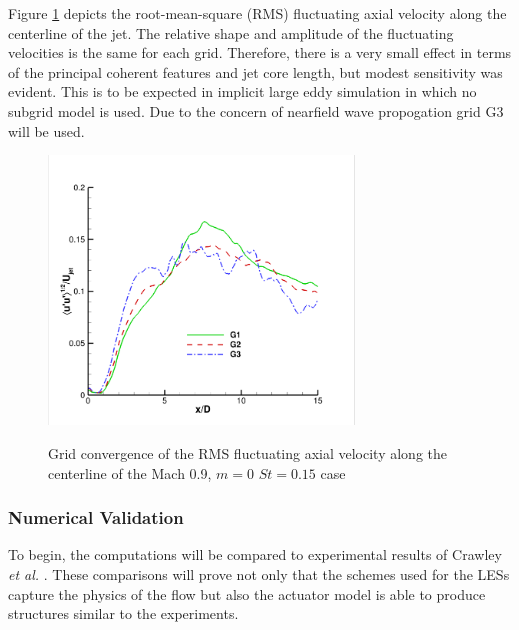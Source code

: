 \documentclass[english]{aiaa-tc}
\begin{document}
Figure \ref{meangridrmsM09} depicts the root-mean-square (RMS) fluctuating axial velocity along the centerline of the jet. The relative shape and amplitude of the fluctuating velocities is the same for each grid. Therefore, there is a very small
effect in terms of the principal coherent features and jet core
length, but modest sensitivity was evident. This is to be expected in implicit large eddy simulation in which no subgrid model is used. Due to the concern of nearfield wave propogation grid G3 will be used. 
\begin{figure}
\begin{center}
{\includegraphics[width=3.2in]{gridstudyM09rmscenter.png}
\label{meangridrmsM09}}
\caption{Grid convergence of the RMS fluctuating axial velocity along the centerline of the Mach 0.9, $m=0$ $St=0.15$ case}
\end{center}
 \end{figure}

\subsubsection{Numerical Validation}
To begin, the computations will be compared to experimental results of Crawley {\em et al.} \cite{Crawley2014}. These comparisons will prove not only that the schemes used for the LESs capture the physics of the flow but also the actuator model is able to produce structures similar to the experiments.
\end{document}
